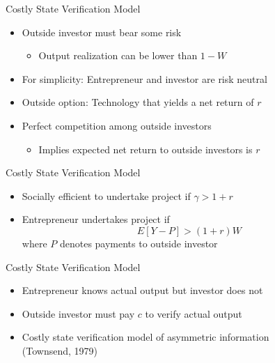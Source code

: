 \documentclass[11pt,aspectratio=169,xcolor={dvipsnames},hyperref={pdftex,pdfpagemode=UseNone,hidelinks,pdfdisplaydoctitle=true},usepdftitle=false]{beamer}
\begin{document}
\begin{frame}{Costly State Verification Model}
\begin{itemize}
	\itemsep1em 
	\item Outside investor must bear some risk
	\begin{itemize}
		\item Output realization can be lower than $1-W$
	\end{itemize}
	\item For simplicity: Entrepreneur and investor are risk neutral
	\item Outside option: Technology that yields a net return of $r$
	\item Perfect competition among outside investors
	\begin{itemize}
		\item Implies expected net return to outside investors is $r$
	\end{itemize}
\end{itemize}
\end{frame}


\begin{frame}{Costly State Verification Model}
\begin{itemize}
	\itemsep1em 
	\item Socially efficient to undertake project if $\gamma > 1+r$
	\item Entrepreneur undertakes project if
	\[ E[Y - P] > (1+r) W \]
	where $P$ denotes payments to outside investor
\end{itemize}
\end{frame}


\begin{frame}{Costly State Verification Model}
\begin{itemize}
	\itemsep1em 
	\item Entrepreneur knows actual output but investor does not
	\item Outside investor must pay $c$ to verify actual output
	\item Costly state verification model of asymmetric information \\ {\small (Townsend, 1979)}
\end{itemize}
\end{frame}
\end{document}

